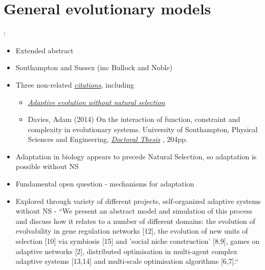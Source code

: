 \section{General evolutionary models}

\autocite{Watson2010}:

\begin{itemize}
	\item
	
	Extended abstract
	
	\item
	
	Southampton and Sussex (inc Bullock and Noble)
	
	\item
	
	Three non-related
	\href{https://scholar.google.com/scholar?cites=10707786264093825040\&as_sdt=2005\&sciodt=0,5\&hl=en}{\emph{citations}},
	including
	
	
	\begin{itemize}
		\item
		
		\href{http://onlinelibrary.wiley.com/doi/10.1111/bij.12124/abstract?userIsAuthenticated=false\&deniedAccessCustomisedMessage=}{\emph{Adaptive
				evolution without natural selection}}
		
		\item
		
		Davies, Adam (2014) On the interaction of function, constraint and
		complexity in evolutionary systems. University of Southampton,
		Physical Sciences and Engineering,
		\href{http://eprints.soton.ac.uk/374145/}{\emph{Doctoral Thesis}} ,
		204pp.
		
	\end{itemize}
	\item
	
	Adaptation in biology appears to precede Natural Selection, so
	adaptation is possible without NS
	
	\item
	
	Fundamental open question - mechanisms for adaptation
	
	\item
	
	Explored through variety of different projects, self-organized
	adaptive systems without NS - ``We present an abstract model and
	simulation of this process and discuss how it relates to a number of
	different domains: the evolution of evolvability in gene regulation
	networks {[}12{]}, the evolution of new units of selection {[}10{]}
	via symbiosis {[}15{]} and 'social niche construction' {[}8,9{]},
	games on adaptive networks {[}2{]}, distributed optimisation in
	multi-agent complex adaptive systems {[}13,14{]} and multi-scale
	optimisation algorithms {[}6,7{]}.``
	
\end{itemize}


